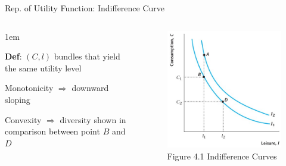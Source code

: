 \documentclass[11pt,aspectratio=43]{beamer}
\let\olditemize=\itemize
\let\endolditemize=\enditemize
\renewenvironment{itemize}{\olditemize \itemsep1em}{\endolditemize}
\theoremstyle{definition}
\begin{document}
\begin{frame}{Rep. of Utility Function: Indifference Curve}
\label{slide:Representation_of_Utility_Function__Indifference_Curve}
\begin{columns}
    \begin{column}{0.5\textwidth}
        \begin{itemize}
            \item \textbf{Def}: $ ( C, l ) $ bundles that yield \alert{the same} utility level
            \item \alert{Monotonicity} $ \Rightarrow  $ downward sloping
            \item \alert{Convexity} $ \Rightarrow  $ diversity shown in comparison between point $ B $ and $ D $
        \end{itemize}
    \end{column}
    \begin{column}{0.5\textwidth}
        \begin{figure}
            \caption{Figure 4.1 Indifference Curves}
            \includegraphics[width=\textwidth]{./figures/Figure4_1.jpg}
        \end{figure}
    \end{column}
\end{columns}
\end{frame}
\end{document}

